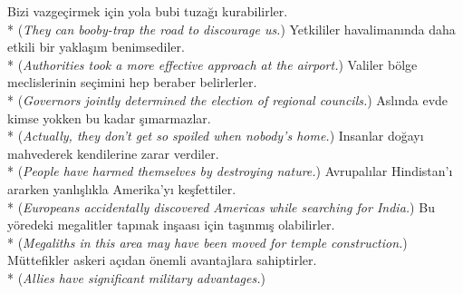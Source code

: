 \ex Bizi vazge\c{c}irmek i\c{c}in yola bubi tuza\u{g}{\i} kurabilirler. \\*
({\it They can booby-trap the road to discourage us.})
\ex Yetkililer havaliman{\i}nda daha etkili bir yakla\c{s}{\i}m benimsediler. \\*
({\it Authorities took a more effective approach at the airport.})
\ex Valiler b\"{o}lge meclislerinin se\c{c}imini hep beraber belirlerler. \\*
({\it Governors jointly determined the election of regional councils.})
\ex Asl{\i}nda evde kimse yokken bu kadar \c{s}{\i}marmazlar. \\*
({\it Actually, they don't get so spoiled when nobody's home.})
\ex Insanlar do\u{g}ay{\i} mahvederek kendilerine zarar verdiler. \\*
({\it People have harmed themselves by destroying nature.})
\ex Avrupal{\i}lar Hindistan'{\i} ararken yanl{\i}\c{s}l{\i}kla Amerika'y{\i} ke\c{s}fettiler. \\*
({\it Europeans accidentally discovered Americas while searching for India.})
\ex Bu y\"{o}redeki megalitler tap{\i}nak in\c{s}aas{\i} i\c{c}in ta\c{s}{\i}nm{\i}\c{s} olabilirler. \\*
({\it Megaliths in this area may have been moved for temple construction.})
\ex M\"{u}ttefikler askeri a\c{c}{\i}dan \"{o}nemli avantajlara sahiptirler. \\*
({\it Allies have significant military advantages.})
\z

